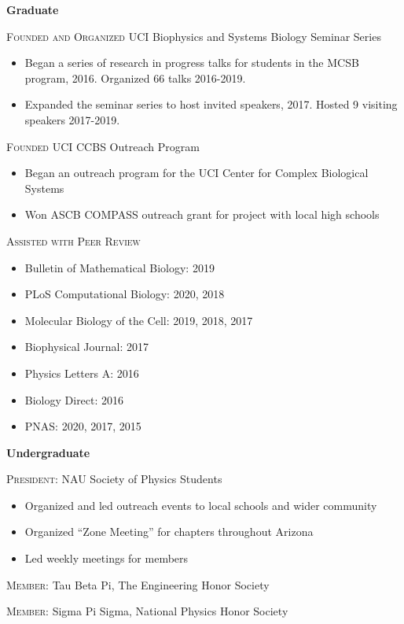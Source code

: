 \documentclass[letterpaper,10pt]{article} %
\begin{document}
\bigskip
{\large \textbf{Graduate}}

\textsc{Founded and Organized} UCI Biophysics and Systems Biology Seminar Series
\begin{itemize}
\item Began a series of research in progress talks for students in the MCSB program, 2016. Organized 66 talks 2016-2019.
\item Expanded the seminar series to host invited speakers, 2017. Hosted 9 visiting speakers 2017-2019.
\end{itemize}

\textsc{Founded} UCI CCBS Outreach Program
\begin{itemize}
\item Began an outreach program for the UCI Center for Complex Biological Systems
\item Won ASCB COMPASS outreach grant for project with local high schools
\end{itemize}

\textsc{Assisted with Peer Review}
\begin{itemize}
\item Bulletin of Mathematical Biology: 2019
\item PLoS Computational Biology: 2020, 2018
\item Molecular Biology of the Cell: 2019, 2018, 2017
\item Biophysical Journal: 2017
\item Physics Letters A: 2016
\item Biology Direct: 2016
\item PNAS: 2020, 2017, 2015
\end{itemize}

\bigskip

{\large \textbf{Undergraduate}}

\textsc{President:} NAU Society of Physics Students
\begin{itemize}
\item Organized and led outreach events to local schools and wider community
\item Organized ``Zone Meeting'' for chapters throughout Arizona
\item Led weekly meetings for members
\end{itemize}

\textsc{Member:} Tau Beta Pi, The Engineering Honor Society

\textsc{Member:} Sigma Pi Sigma, National Physics Honor Society
\end{document}
